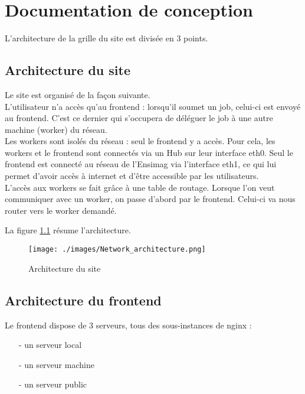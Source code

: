 \newpage

\chapter{Documentation de conception}

L'architecture de la grille du site est divisée en 3 points.

\section{Architecture du site}

Le site est organisé de la façon suivante. \\

L'utilisateur n'a accès qu'au frontend : lorsqu'il soumet un job, celui-ci est envoyé au frontend. C'est ce dernier qui s'occupera de déléguer le job à une autre machine (worker) du réseau. \\

Les workers sont isolés du réseau : seul le frontend y a accès. Pour cela, les workers et le frontend sont connectés via un Hub sur leur interface eth0. Seul le frontend est connecté au réseau de l'Ensimag via l'interface eth1, ce qui lui permet d'avoir accès à internet et d'être accessible par les utilisateurs. \\

L'accès aux workers se fait grâce à une table de routage. Lorsque l'on veut communiquer avec un worker, on passe d'abord par le frontend. Celui-ci va nous router vers le worker demandé.

La figure \ref{net_arch} résume l'architecture.

\begin{figure}[!hbtp]
    \centering
    \texttt{[image: ./images/Network\_architecture.png]}
    \label{net_arch}
    \caption{Architecture du site}
\end{figure}

\section{Architecture du frontend}

Le frontend dispose de 3 serveurs, tous des sous-instances de nginx : 

\begin{itemize}
\item[-] un serveur local
\item[-] un serveur machine
\item[-] un serveur public \\
\end{itemize}

